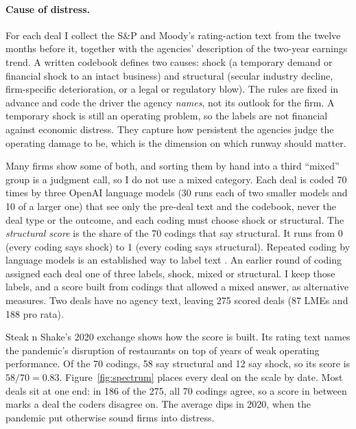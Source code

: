 \documentclass[12pt]{article}
\begin{document}
\paragraph{Cause of distress.} For each deal I collect the S\&P and Moody's rating-action text from the twelve months before it, together with the agencies' description of the two-year earnings trend. A written codebook defines two causes: shock (a temporary demand or financial shock to an intact business) and structural (secular industry decline, firm-specific deterioration, or a legal or regulatory blow). The rules are fixed in advance and code the driver the agency \emph{names}, not its outlook for the firm. A temporary shock is still an operating problem, so the labels are not financial against economic distress. They capture how persistent the agencies judge the operating damage to be, which is the dimension on which runway should matter.

Many firms show some of both, and sorting them by hand into a third ``mixed'' group is a judgment call, so I do not use a mixed category. Each deal is coded 70 times by three OpenAI language models (30 runs each of two smaller models and 10 of a larger one) that see only the pre-deal text and the codebook, never the deal type or the outcome, and each coding must choose shock or structural. The \emph{structural score} is the share of the 70 codings that say structural. It runs from 0 (every coding says shock) to 1 (every coding says structural). Repeated coding by language models is an established way to label text \citep{gilardi2023}. An earlier round of coding assigned each deal one of three labels, shock, mixed or structural. I keep those labels, and a score built from codings that allowed a mixed answer, as alternative measures. Two deals have no agency text, leaving 275 scored deals (87 LMEs and 188 pro rata).

Steak n Shake's 2020 exchange shows how the score is built. Its rating text names the pandemic's disruption of restaurants on top of years of weak operating performance. Of the 70 codings, 58 say structural and 12 say shock, so its score is $58/70 = 0.83$. Figure~\ref{fig:spectrum} places every deal on the scale by date. Most deals sit at one end: in 186 of the 275, all 70 codings agree, so a score in between marks a deal the coders disagree on. The average dips in 2020, when the pandemic put otherwise sound firms into distress.


\end{document}
